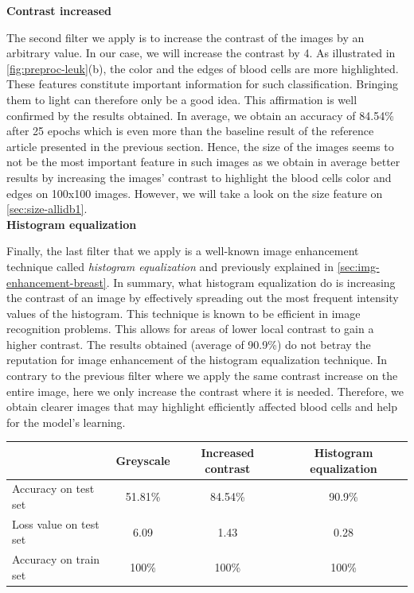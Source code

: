 \documentclass[11pt, openany]{report}
\theoremstyle{plain}
\theoremstyle{definition}
\theoremstyle{remark}
\begin{document}
\textbf{Contrast increased} 

The second filter we apply is to increase the contrast of the images by an arbitrary value. In our case, we will increase the contrast by 4. As illustrated in \autoref{fig:preproc-leuk}(b), the color and the edges of blood cells are more highlighted. These features constitute important information for such classification. Bringing them to light can therefore only be a good idea. This affirmation is well confirmed by the results obtained. In average, we obtain an accuracy of 84.54\% after 25 epochs which is even more than the baseline result of the reference article presented in the previous section. Hence, the size of the images seems to not be the most important feature in such images as we obtain in average better results by increasing the images' contrast to highlight the blood cells color and edges on 100x100 images. However, we will take a look on the size feature on \autoref{sec:size-allidb1}. \\

\textbf{Histogram equalization} 

Finally, the last filter that we apply is a well-known image enhancement technique called \textit{histogram equalization} and previously explained in \autoref{sec:img-enhancement-breast}. In summary, what histogram equalization do is increasing the contrast of an image by effectively spreading out the most frequent intensity values of the histogram. This technique is known to be efficient in image recognition problems. This allows for areas of lower local contrast to gain a higher contrast. The results obtained (average of 90.9\%) do not betray the reputation for image enhancement of the histogram equalization technique. In contrary to the previous filter where we apply the same contrast increase on the entire image, here we only increase the contrast where it is needed. Therefore, we obtain clearer images that may highlight efficiently affected blood cells and help for the model's learning.  

\vspace{1cm}

\begin{center}
\begin{tabular}{|l|c|c|c|}
  \hline
   & \textbf{Greyscale} & \textbf{Increased contrast} & \textbf{Histogram equalization} \\
  \hline
  Accuracy on test set & 51.81\% & 84.54\% & 90.9\% \\
  Loss value on test set & 6.09 & 1.43 &  0.28\\ 
  Accuracy on train set & 100\% & 100\% & 100\% \\ 
  \hline
\end{tabular}
\label{table:results-A2}
\end{center}
\end{document}
